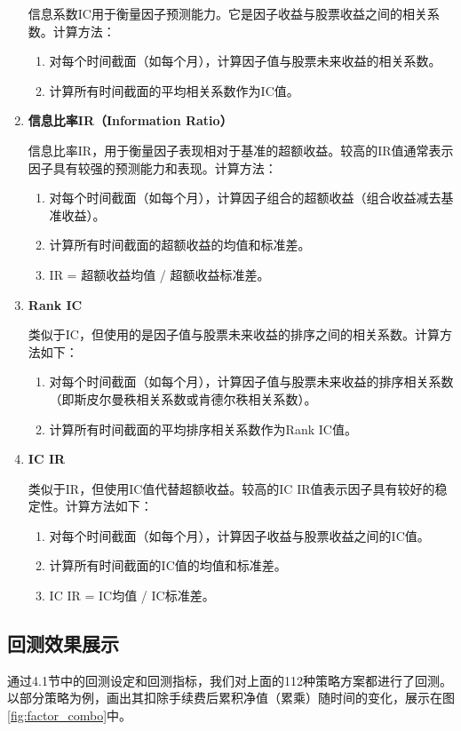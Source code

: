 \documentclass[11pt]{article}
\begin{document}
\begin{enumerate}
信息系数IC用于衡量因子预测能力。它是因子收益与股票收益之间的相关系数。计算方法：
    \begin{enumerate}
    \item 对每个时间截面（如每个月），计算因子值与股票未来收益的相关系数。
    \item 计算所有时间截面的平均相关系数作为IC值。
    \end{enumerate}
\item \textbf{信息比率IR（Information Ratio）}

信息比率IR，用于衡量因子表现相对于基准的超额收益。较高的IR值通常表示因子具有较强的预测能力和表现。计算方法：
    \begin{enumerate}
    \item 对每个时间截面（如每个月），计算因子组合的超额收益（组合收益减去基准收益）。
    \item 计算所有时间截面的超额收益的均值和标准差。
    \item IR = 超额收益均值 / 超额收益标准差。
    \end{enumerate}
\item \textbf{Rank IC}

类似于IC，但使用的是因子值与股票未来收益的排序之间的相关系数。计算方法如下：
    \begin{enumerate}
    \item 对每个时间截面（如每个月），计算因子值与股票未来收益的排序相关系数（即斯皮尔曼秩相关系数或肯德尔秩相关系数）。
    \item 计算所有时间截面的平均排序相关系数作为Rank IC值。
    \end{enumerate}
\item \textbf{IC IR}

类似于IR，但使用IC值代替超额收益。较高的IC IR值表示因子具有较好的稳定性。计算方法如下：
    \begin{enumerate}
    \item 对每个时间截面（如每个月），计算因子收益与股票收益之间的IC值。
    \item 计算所有时间截面的IC值的均值和标准差。
    \item IC IR = IC均值 / IC标准差。
    \end{enumerate}
\end{enumerate}


\subsection{回测效果展示}
通过4.1节中的回测设定和回测指标，我们对上面的112种策略方案都进行了回测。以部分策略为例，画出其扣除手续费后累积净值（累乘）随时间的变化，展示在图\ref{fig:factor_combo}中。
\end{document}
